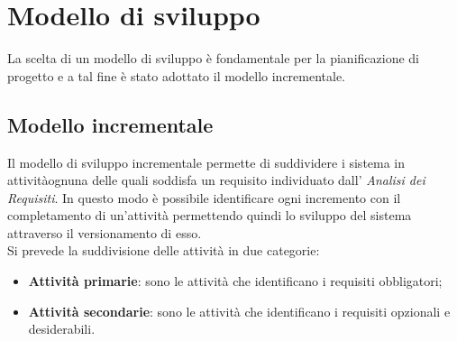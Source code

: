 \section{Modello di sviluppo}
La scelta di un modello di sviluppo è fondamentale per la pianificazione di 
progetto e a tal fine è stato adottato il modello incrementale.
\subsection{Modello incrementale}
Il modello di sviluppo incrementale permette di suddividere i sistema in 
attività\glosp ognuna delle quali soddisfa un requisito\glosp 
individuato dall' \textit{Analisi dei Requisiti}. In questo modo è possibile 
identificare ogni incremento con il completamento di un'attività permettendo 
quindi lo sviluppo del sistema attraverso il versionamento di esso. \\
Si prevede la suddivisione delle attività in due categorie: 
\begin{itemize}
	\item \textbf{Attività primarie}: sono le attività che identificano i 
	requisiti obbligatori;
	\item \textbf{Attività secondarie}: sono le attività che identificano i 
	requisiti opzionali e desiderabili.
\end{itemize}
